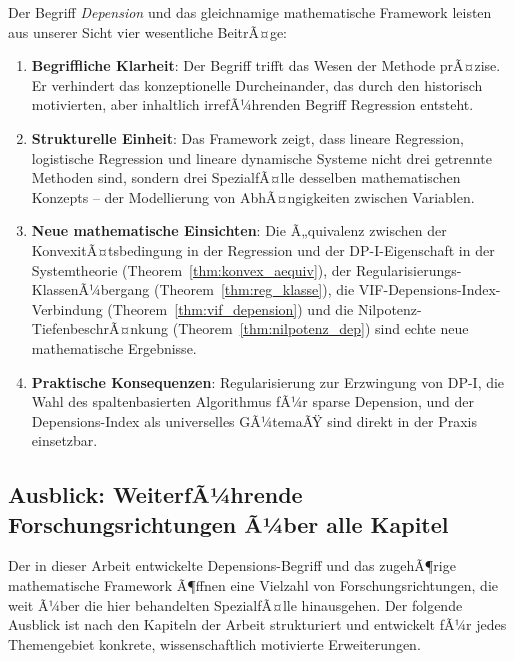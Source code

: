 ﻿\documentclass[12pt, a4paper]{article}
\theoremstyle{definition}
\theoremstyle{remark}
\begin{document}
Der Begriff \emph{Depension} und das gleichnamige mathematische Framework leisten
aus unserer Sicht vier wesentliche BeitrÃ¤ge:

\begin{enumerate}[label=(\arabic*)]
  \item \textbf{Begriffliche Klarheit}: Der Begriff trifft das Wesen der Methode
    prÃ¤zise. Er verhindert das konzeptionelle Durcheinander, das durch den historisch
    motivierten, aber inhaltlich irrefÃ¼hrenden Begriff Regression entsteht.

  \item \textbf{Strukturelle Einheit}: Das Framework zeigt, dass lineare Regression,
    logistische Regression und lineare dynamische Systeme nicht drei getrennte
    Methoden sind, sondern drei SpezialfÃ¤lle desselben mathematischen Konzepts --
    der Modellierung von AbhÃ¤ngigkeiten zwischen Variablen.

  \item \textbf{Neue mathematische Einsichten}: Die Ã„quivalenz zwischen der
    KonvexitÃ¤tsbedingung in der Regression und der DP-I-Eigenschaft in der
    Systemtheorie (Theorem~\ref{thm:konvex_aequiv}), der Regularisierungs-KlassenÃ¼bergang
    (Theorem~\ref{thm:reg_klasse}), die VIF-Depensions-Index-Verbindung
    (Theorem~\ref{thm:vif_depension}) und die Nilpotenz-TiefenbeschrÃ¤nkung
    (Theorem~\ref{thm:nilpotenz_dep}) sind echte neue mathematische Ergebnisse.

  \item \textbf{Praktische Konsequenzen}: Regularisierung zur Erzwingung von DP-I,
    die Wahl des spaltenbasierten Algorithmus fÃ¼r sparse Depension, und der
    Depensions-Index als universelles GÃ¼temaÃŸ sind direkt in der Praxis einsetzbar.
\end{enumerate}

\subsection{Ausblick: WeiterfÃ¼hrende Forschungsrichtungen Ã¼ber alle Kapitel}

Der in dieser Arbeit entwickelte Depensions-Begriff und das zugehÃ¶rige mathematische
Framework Ã¶ffnen eine Vielzahl von Forschungsrichtungen, die weit Ã¼ber die hier
behandelten SpezialfÃ¤lle hinausgehen. Der folgende Ausblick ist nach den Kapiteln
der Arbeit strukturiert und entwickelt fÃ¼r jedes Themengebiet konkrete, wissenschaftlich
motivierte Erweiterungen.

\end{document}
